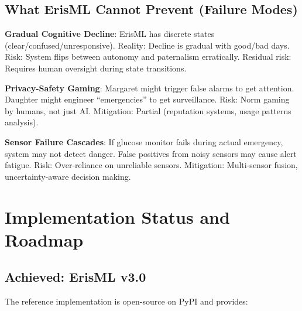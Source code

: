 \documentclass[conference]{IEEEtran}
\begin{document}
\subsection{What ErisML Cannot Prevent (Failure Modes)}

\textbf{Gradual Cognitive Decline}: ErisML has discrete states
(clear/confused/unresponsive). Reality: Decline is gradual with
good/bad days. Risk: System flips between autonomy and paternalism
erratically. Residual risk: Requires human oversight during state
transitions.

\textbf{Privacy-Safety Gaming}: Margaret might trigger false alarms to
get attention. Daughter might engineer ``emergencies'' to get
surveillance. Risk: Norm gaming by humans, not just AI. Mitigation:
Partial (reputation systems, usage patterns analysis).

\textbf{Sensor Failure Cascades}: If glucose monitor fails during
actual emergency, system may not detect danger. False positives from
noisy sensors may cause alert fatigue. Risk: Over-reliance on
unreliable sensors. Mitigation: Multi-sensor fusion, uncertainty-aware
decision making.

\section{Implementation Status and Roadmap}
\label{sec:roadmap}

\subsection{Achieved: ErisML v3.0}

The reference implementation is open-source on PyPI and provides:
\end{document}
